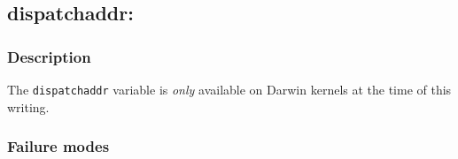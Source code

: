 \clearpage
{}
{}
\label{vars:dispatchaddr}
\subsection*{dispatchaddr:}

\subsubsection*{Description}

The \verb|dispatchaddr| variable is \emph{only} available on Darwin kernels
at the time of this writing.

\subsubsection*{Failure modes}

